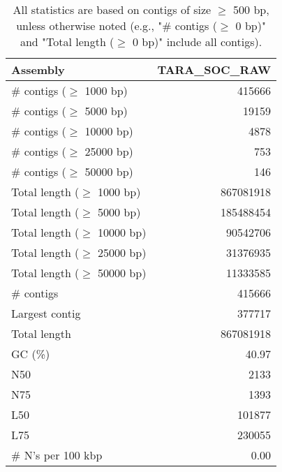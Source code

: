 \documentclass[12pt,a4paper]{article}
\begin{document}
\begin{table}[ht]
\begin{center}
\caption{All statistics are based on contigs of size $\geq$ 500 bp, unless otherwise noted (e.g., "\# contigs ($\geq$ 0 bp)" and "Total length ($\geq$ 0 bp)" include all contigs).}
\begin{tabular}{|l*{1}{|r}|}
\hline
Assembly & TARA\_SOC\_RAW \\ \hline
\# contigs ($\geq$ 1000 bp) & 415666 \\ \hline
\# contigs ($\geq$ 5000 bp) & 19159 \\ \hline
\# contigs ($\geq$ 10000 bp) & 4878 \\ \hline
\# contigs ($\geq$ 25000 bp) & 753 \\ \hline
\# contigs ($\geq$ 50000 bp) & 146 \\ \hline
Total length ($\geq$ 1000 bp) & 867081918 \\ \hline
Total length ($\geq$ 5000 bp) & 185488454 \\ \hline
Total length ($\geq$ 10000 bp) & 90542706 \\ \hline
Total length ($\geq$ 25000 bp) & 31376935 \\ \hline
Total length ($\geq$ 50000 bp) & 11333585 \\ \hline
\# contigs & 415666 \\ \hline
Largest contig & 377717 \\ \hline
Total length & 867081918 \\ \hline
GC (\%) & 40.97 \\ \hline
N50 & 2133 \\ \hline
N75 & 1393 \\ \hline
L50 & 101877 \\ \hline
L75 & 230055 \\ \hline
\# N's per 100 kbp & 0.00 \\ \hline
\end{tabular}
\end{center}
\end{table}
\end{document}
